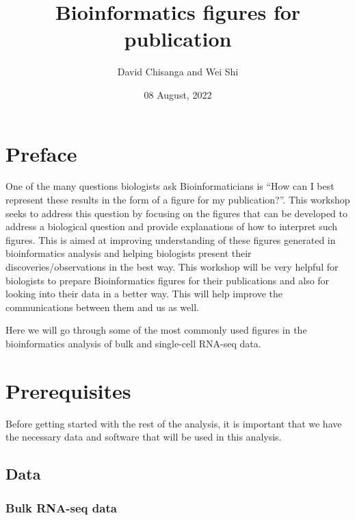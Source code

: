 \documentclass[
  openany]{book}
\title{Bioinformatics figures for publication}
\author{David Chisanga and Wei Shi}
\date{08 August, 2022}
\begin{document}
\maketitle

{
\setcounter{tocdepth}{1}
\tableofcontents
}
\hypertarget{preface}{%
\chapter{Preface}\label{preface}}

One of the many questions biologists ask Bioinformaticians is ``How can I best represent these results in the form of a figure for my publication?''. This workshop seeks to address this question by focusing on the figures that can be developed to address a biological question and provide explanations of how to interpret such figures. This is aimed at improving understanding of these figures generated in bioinformatics analysis and helping biologists present their discoveries/observations in the best way. This workshop will be very helpful for biologists to prepare Bioinformatics figures for their publications and also for looking into their data in a better way. This will help improve the communications between them and us as well.

Here we will go through some of the most commonly used figures in the bioinformatics analysis of bulk and single-cell RNA-seq data.

\vspace{-100pt}

\vspace{-100pt}

\hypertarget{prerequisites}{%
\chapter{Prerequisites}\label{prerequisites}}

Before getting started with the rest of the analysis, it is important that we have the necessary data and software that will be used in this analysis.

\hypertarget{prereq}{%
\section{Data}\label{prereq}}

\hypertarget{bulk-rna-seq-data}{%
\subsection{Bulk RNA-seq data}\label{bulk-rna-seq-data}}
\end{document}
